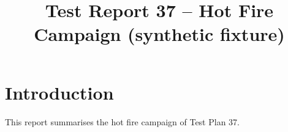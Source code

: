 \documentclass{article}
\title{Test Report 37 -- Hot Fire Campaign (synthetic fixture)}
\begin{document}
\maketitle
\section{Introduction}
This report summarises the hot fire campaign of Test Plan 37.

\end{document}
